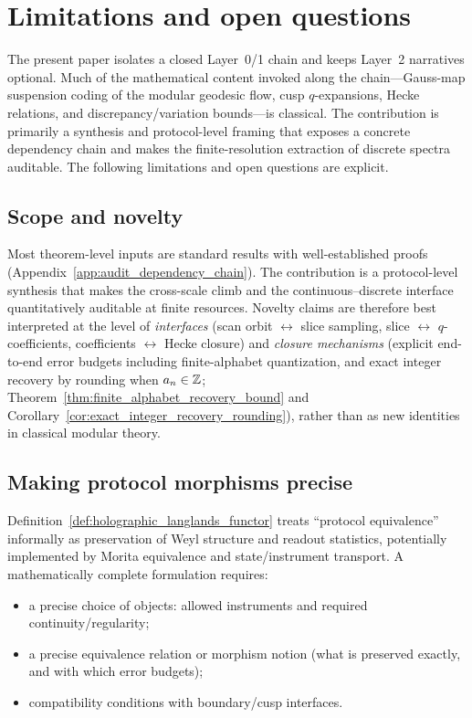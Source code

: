 
\section{Limitations and open questions}
\label{app:limitations_open_questions}

The present paper isolates a closed Layer~0/1 chain and keeps Layer~2 narratives optional.
Much of the mathematical content invoked along the chain---Gauss-map suspension coding of the modular geodesic flow, cusp $q$-expansions, Hecke relations, and discrepancy/variation bounds---is classical.
The contribution is primarily a synthesis and protocol-level framing that exposes a concrete dependency chain and makes the finite-resolution extraction of discrete spectra auditable.
The following limitations and open questions are explicit.

\subsection{Scope and novelty}
\label{app:limitations_scope_novelty}

Most theorem-level inputs are standard results with well-established proofs (Appendix~\ref{app:audit_dependency_chain}). The contribution is a protocol-level synthesis that makes the cross-scale climb and the continuous--discrete interface quantitatively auditable at finite resources. Novelty claims are therefore best interpreted at the level of \emph{interfaces} (scan orbit $\leftrightarrow$ slice sampling, slice $\leftrightarrow$ $q$-coefficients, coefficients $\leftrightarrow$ Hecke closure) and \emph{closure mechanisms} (explicit end-to-end error budgets including finite-alphabet quantization, and exact integer recovery by rounding when $a_n\in\mathbb{Z}$; Theorem~\ref{thm:finite_alphabet_recovery_bound} and Corollary~\ref{cor:exact_integer_recovery_rounding}), rather than as new identities in classical modular theory.

\subsection{Making protocol morphisms precise}

Definition~\ref{def:holographic_langlands_functor} treats ``protocol equivalence'' informally as preservation of Weyl structure and readout statistics, potentially implemented by Morita equivalence and state/instrument transport. A mathematically complete formulation requires:
\begin{itemize}
\item a precise choice of objects: allowed instruments and required continuity/\allowbreak regularity;
\item a precise equivalence relation or morphism notion (what is preserved exactly, and with which error budgets);
\item compatibility conditions with boundary/cusp interfaces.
\end{itemize}

